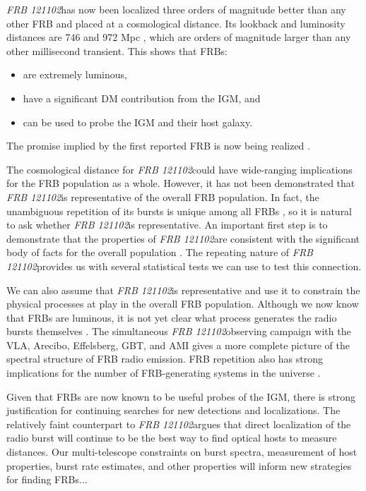 \documentclass{emulateapj}
\newcommand{\frb}{\emph{FRB 121102}}
\begin{document}
\frb has now been localized three orders of magnitude better than any other FRB and placed at a cosmological distance. Its lookback and luminosity distances are 746 and 972 Mpc \citep{planck15}, which are orders of magnitude larger than any other millisecond transient. This shows that FRBs:
\begin{itemize}
 \item are extremely luminous, 
 \item have a significant DM contribution from the IGM, and
 \item can be used to probe the IGM and their host galaxy.
\end{itemize}
The promise implied by the first reported FRB is now being realized \citep{2007Sci...318..777L}.

The cosmological distance for \frb could have wide-ranging implications for the FRB population as a whole. However, it has not been demonstrated that \frb is representative of the overall FRB population. In fact, the unambiguous repetition of its bursts is unique among all FRBs \citep{2015MNRAS.454..457P}, so it is natural to ask whether \frb is representative. An important first step is to demonstrate that the properties of \frb are consistent with the significant body of facts for the overall population \citep{2015MNRAS.451.3278M, 2016MPLA...3130013K}. The repeating nature of \frb provides us with several statistical tests we can use to test this connection.

We can also assume that \frb is representative and use it to constrain the physical processes at play in the overall FRB population. Although we now know that FRBs are luminous, it is not yet clear what process generates the radio bursts themselves \citep{2014PhRvD..89j3009K, 2014ApJ...785L..26L, 2016MNRAS.457..232C}. The simultaneous \frb observing campaign with the VLA, Arecibo, Effelsberg, GBT, and AMI gives a more complete picture of the spectral structure of FRB radio emission. FRB repetition also has strong implications for the number of FRB-generating systems in the universe \citep{2016MNRAS.458L..89C}.

Given that FRBs are now known to be useful probes of the IGM, there is strong justification for continuing searches for new detections and localizations. The relatively faint counterpart to \frb argues that direct localization of the radio burst will continue to be the best way to find optical hosts to measure distances. Our multi-telescope constraints on burst spectra, measurement of host properties, burst rate estimates, and other properties will inform new strategies for finding FRBs...
\end{document}
